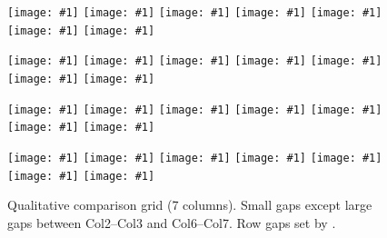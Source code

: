 \documentclass[journal,twoside,web]{ieeecolor}
\begin{document}
\begin{figure}[!t]
\centering

\newlength{\sepS}\setlength{\sepS}{0.8pt}   %
\newlength{\sepL}\setlength{\sepL}{10pt}    %
\newlength{\sepY}\setlength{\sepY}{3pt}     %

\newlength{\colw}\setlength{\colw}{\dimexpr(\linewidth - 4\sepS - 2\sepL)/7\relax}

\newcommand{\Img}[1]{%
  \texttt{[image: \#1]}%
}

\newcommand{\Row}[7]{%
  \noindent
  \Img{#1}\hspace{\sepS}%
  \Img{#2}\hspace{\sepL}%
  \Img{#3}\hspace{\sepS}%
  \Img{#4}\hspace{\sepS}%
  \Img{#5}\hspace{\sepS}%
  \Img{#6}\hspace{\sepL}%
  \Img{#7}\par
}

\Row{evaluation.jpg}{evaluation.jpg}{evaluation.jpg}{evaluation.jpg}{evaluation.jpg}{evaluation.jpg}{evaluation.jpg}\vspace{\sepY}
\Row{evaluation.jpg}{evaluation.jpg}{evaluation.jpg}{evaluation.jpg}{evaluation.jpg}{evaluation.jpg}{evaluation.jpg}\vspace{\sepY}
\Row{evaluation.jpg}{evaluation.jpg}{evaluation.jpg}{evaluation.jpg}{evaluation.jpg}{evaluation.jpg}{evaluation.jpg}\vspace{\sepY}
\Row{evaluation.jpg}{evaluation.jpg}{evaluation.jpg}{evaluation.jpg}{evaluation.jpg}{evaluation.jpg}{evaluation.jpg}

\noindent
{}\hspace{\sepS}%
\hspace{\sepL}%
\hspace{\sepS}%
\hspace{\sepS}%
\hspace{\sepS}%
\hspace{\sepL}%

\caption{Qualitative comparison grid (7 columns). Small gaps except large gaps between Col2–Col3 and Col6–Col7. Row gaps set by \texttt{\string\sepY}.}
\label{fig:evaluation-grid-7}
\end{figure}
\end{document}
